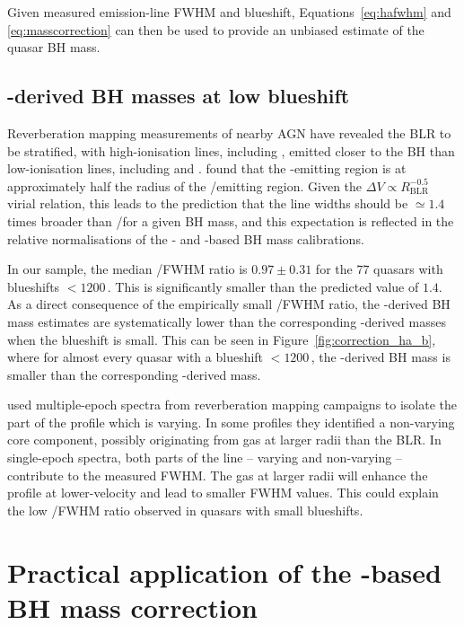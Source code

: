 \noindent Given measured  emission-line FWHM and blueshift, Equations~\ref{eq:hafwhm} and \ref{eq:masscorrection} can then be used to provide an unbiased estimate of the quasar BH mass.

\subsection{-derived BH masses at low  blueshift}

Reverberation mapping measurements of nearby AGN have revealed the BLR to be stratified, with high-ionisation lines, including , emitted closer to the BH than low-ionisation lines, including \ha and \hb \citep[e.g.][]{onken02}.
\citet{vestergaard06} found that the -emitting region is at approximately half the radius of the \hbns/\ha emitting region.
Given the $\Delta V \propto R_{\text{BLR}}^{-0.5}$ virial relation, this leads to the prediction that the  line widths should be $\simeq 1.4$ times broader than \hans/\hb for a given BH mass, and this expectation is reflected in the relative normalisations of the \citet{vestergaard06} - and \hbns-based BH mass calibrations.

In our sample, the median /\ha FWHM ratio is $0.97 \pm 0.31$ for the $77$ quasars with  blueshifts $<1200$\,\kms.
This is significantly smaller than the predicted value of $1.4$.
As a direct consequence of the empirically small /\ha FWHM ratio, the -derived BH mass estimates are systematically lower than the corresponding \hans-derived masses when the blueshift is small.
This can be seen in Figure~\ref{fig:correction_ha_b}, where for almost every quasar with a  blueshift $<$$1200$\,\kms, the -derived BH mass is smaller than the corresponding \hans-derived mass.

\citet{denney12} used multiple-epoch spectra from reverberation mapping campaigns to isolate the part of the  profile which is varying.
In some profiles they identified a non-varying core component, possibly originating from gas at larger radii than the BLR.
In single-epoch spectra, both parts of the line -- varying and non-varying -- contribute to the measured FWHM.
The gas at larger radii will enhance the profile at lower-velocity and lead to smaller FWHM values.
This could explain the low /\ha FWHM ratio observed in quasars with small  blueshifts.

\section{Practical application of the -based BH mass correction}

